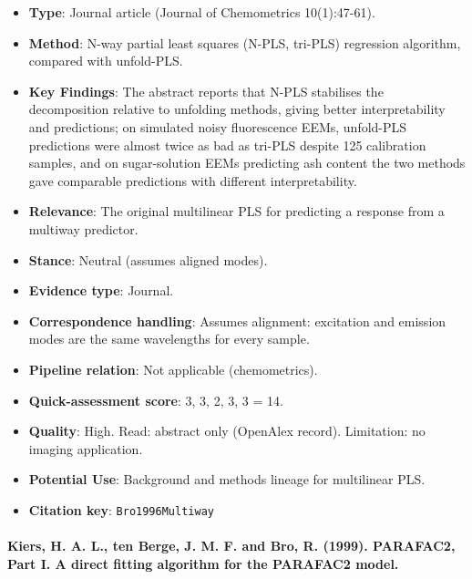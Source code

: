 \documentclass[journal,onecolumn]{IEEEtran}
\begin{document}
\begin{itemize}

\item{} \textbf{Type}: Journal article (Journal of Chemometrics 10(1):47-61).

\item{} \textbf{Method}: N-way partial least squares (N-PLS, tri-PLS) regression algorithm, compared with unfold-PLS.

\item{} \textbf{Key Findings}: The abstract reports that N-PLS stabilises the decomposition relative to unfolding methods, giving better interpretability and predictions; on simulated noisy fluorescence EEMs, unfold-PLS predictions were almost twice as bad as tri-PLS despite 125 calibration samples, and on sugar-solution EEMs predicting ash content the two methods gave comparable predictions with different interpretability.

\item{} \textbf{Relevance}: The original multilinear PLS for predicting a response from a multiway predictor.

\item{} \textbf{Stance}: Neutral (assumes aligned modes).

\item{} \textbf{Evidence type}: Journal.

\item{} \textbf{Correspondence handling}: Assumes alignment: excitation and emission modes are the same wavelengths for every sample.

\item{} \textbf{Pipeline relation}: Not applicable (chemometrics).

\item{} \textbf{Quick-assessment score}: 3, 3, 2, 3, 3 = 14.

\item{} \textbf{Quality}: High. Read: abstract only (OpenAlex record). Limitation: no imaging application.

\item{} \textbf{Potential Use}: Background and methods lineage for multilinear PLS.

\item{} \textbf{Citation key}: \texttt{Bro1996Multiway}

\end{itemize}

\paragraph{Kiers, H. A. L., ten Berge, J. M. F. and Bro, R. (1999). PARAFAC2, Part I. A direct fitting algorithm for the PARAFAC2 model.~\cite{Kiers1999PARAFAC2}}\mbox{}
\end{document}
